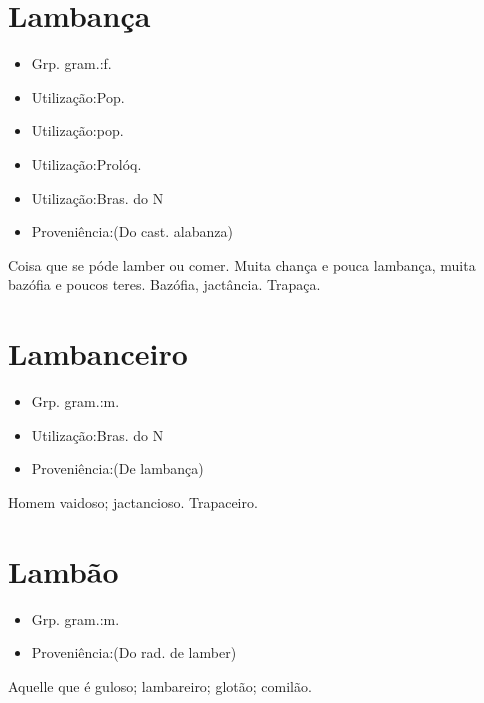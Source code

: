 \section{Lambança}
\begin{itemize}
\item {Grp. gram.:f.}
\end{itemize}
\begin{itemize}
\item {Utilização:Pop.}
\end{itemize}
\begin{itemize}
\item {Utilização:pop.}
\end{itemize}
\begin{itemize}
\item {Utilização:Prolóq.}
\end{itemize}
\begin{itemize}
\item {Utilização:Bras. do N}
\end{itemize}
\begin{itemize}
\item {Proveniência:(Do cast. \textunderscore alabanza\textunderscore )}
\end{itemize}
Coisa que se póde lamber ou comer.
\textunderscore Muita chança e pouca lambança\textunderscore , muita bazófia e poucos teres.
Bazófia, jactância.
Trapaça.
\section{Lambanceiro}
\begin{itemize}
\item {Grp. gram.:m.}
\end{itemize}
\begin{itemize}
\item {Utilização:Bras. do N}
\end{itemize}
\begin{itemize}
\item {Proveniência:(De \textunderscore lambança\textunderscore )}
\end{itemize}
Homem vaidoso; jactancioso.
Trapaceiro.
\section{Lambão}
\begin{itemize}
\item {Grp. gram.:m.}
\end{itemize}
\begin{itemize}
\item {Proveniência:(Do rad. de \textunderscore lamber\textunderscore )}
\end{itemize}
Aquelle que é guloso; lambareiro; glotão; comilão.
